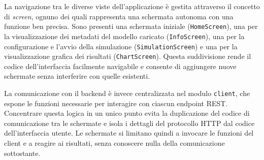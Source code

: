 La navigazione tra le diverse viste dell'applicazione è gestita attraverso il concetto di \emph{screen}, ognuno dei quali rappresenta una schermata autonoma con una funzione ben precisa. Sono presenti una schermata iniziale (\texttt{HomeScreen}), una per la visualizzazione dei metadati del modello caricato (\texttt{InfoScreen}), una per la configurazione e l'avvio della simulazione (\texttt{SimulationScreen}) e una per la visualizzazione grafica dei risultati (\texttt{ChartScreen}). Questa suddivisione rende il codice dell'interfaccia facilmente navigabile e consente di aggiungere nuove schermate senza interferire con quelle esistenti.

La comunicazione con il backend è invece centralizzata nel modulo \texttt{client}, che espone le funzioni necessarie per interagire con ciascun endpoint REST. Concentrare questa logica in un unico punto evita la duplicazione del codice di comunicazione tra le schermate e isola i dettagli del protocollo HTTP dal codice dell'interfaccia utente. Le schermate si limitano quindi a invocare le funzioni del client e a reagire ai risultati, senza conoscere nulla della comunicazione sottostante.